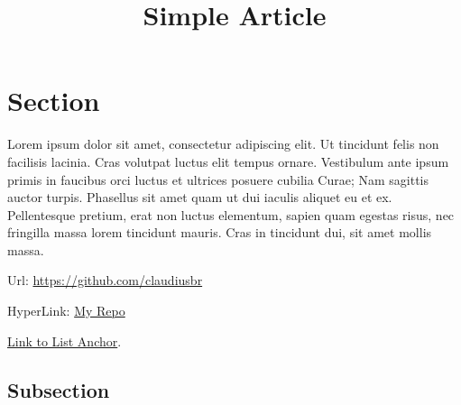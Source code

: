\documentclass[a4paper,12pt]{article}
\title{Simple Article}
\begin{document}
\maketitle

\tableofcontents
\newpage
	
	
\section{Section}
  Lorem ipsum dolor sit amet, consectetur adipiscing elit. Ut tincidunt felis
  non facilisis lacinia. Cras volutpat luctus elit tempus ornare. Vestibulum
  ante ipsum primis in faucibus orci luctus et ultrices posuere cubilia Curae;
  Nam sagittis auctor turpis. Phasellus sit amet quam ut dui iaculis aliquet eu
  et ex. Pellentesque pretium, erat non luctus elementum, sapien quam egestas
  risus, nec fringilla massa lorem tincidunt mauris. Cras in tincidunt dui, sit
  amet mollis massa.

  Url: \url{https://github.com/claudiusbr}

  HyperLink: \href{https://github.com/claudiusbr}{My Repo}

  \hyperref[sec:Step2]{Link to List Anchor}.

	
\subsection{Subsection}

  
\end{document}
